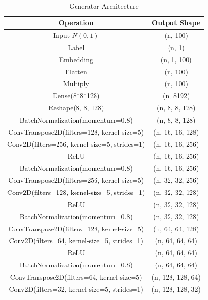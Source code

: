 \begin{center}
    \begin{table}[H]
        \centering
        \caption{\\Generator Architecture}
        \begin{tabular}{c|c}
            Operation & Output Shape \\
            \hline
            Input $N(0,1)$ & (n, 100) \\
            Label        & (n, 1) \\
            Embedding    & (n, 1, 100)\\
            Flatten      & (n, 100) \\
            Multiply     & (n, 100) \\
            Dense(8*8*128)       & (n, 8192) \\
            Reshape(8, 8, 128)      & (n, 8, 8, 128) \\
            BatchNormalization(momentum=0.8) & (n, 8, 8, 128)\\
            ConvTranspose2D(filters=128, kernel-size=5) & (n, 16, 16, 128) \\
            Conv2D(filters=256, kernel-size=5, strides=1)       & (n, 16, 16, 256) \\
            ReLU         & (n, 16, 16, 256)\\
            BatchNormalization(momentum=0.8) & (n, 16, 16, 256)\\
            ConvTranspose2D(filters=256, kernel-size=5) & (n, 32, 32, 256)\\
            Conv2D(filters=128, kernel-size=5, strides=1)      & (n, 32, 32, 128)\\
            ReLU         & (n, 32, 32, 128)\\
            BatchNormalization(momentum=0.8) & (n, 32, 32, 128)\\
            ConvTranspose2D(filters=128, kernel-size=5) & (n, 64, 64, 128)\\
            Conv2D(filters=64, kernel-size=5, strides=1) & (n, 64, 64, 64)\\
            ReLU         & (n, 64, 64, 64)\\
            BatchNormalization(momentum=0.8) & (n, 64, 64, 64)\\
            ConvTranspose2D(filters=64, kernel-size=5) & (n, 128, 128, 64)\\
            Conv2D(filters=32, kernel-size=5, strides=1)       & (n, 128, 128, 32)\\

\end{tabular}
\end{table}
\end{center}
